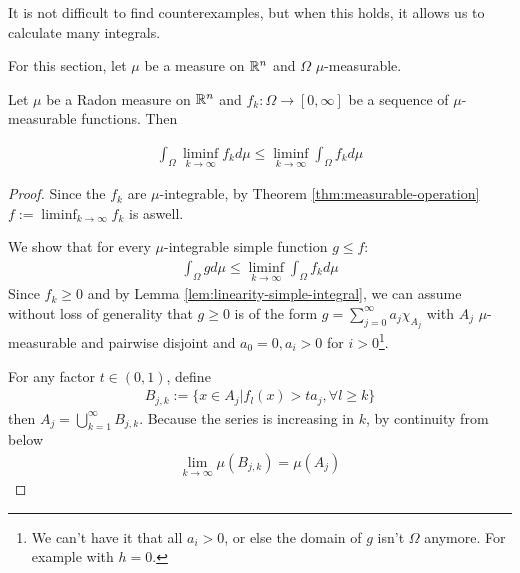 It is not difficult to find counterexamples, but when this holds, it allows us to calculate many integrals.

For this section, let $\mu$ be a measure on $\mathbb{R}^{n}$ and $\Omega$ $\mu$-measurable.


\begin{thm} \label{thm:fatou}
  Let $\mu$ be a Radon measure on $\mathbb{R}^{n}$ and $f_k: \Omega \to [0,\infty]$ be a sequence of $\mu$-measurable functions.
  Then

  \begin{align*}
    \int_{\Omega} \liminf_{k \to \infty} f_k d \mu \leq \liminf_{k \to \infty} \int_{\Omega} f_k d \mu
  \end{align*}
\end{thm}
\begin{proof}
  Since the $f_k$ are $\mu$-integrable, by Theorem \ref{thm:measurable-operation} $f := \liminf_{k \to \infty}f_k$ is aswell.

  We show that for every $\mu$-integrable simple function $g \leq f$:
  \begin{align*}
    \int_{\Omega} g d \mu \leq \liminf_{k \to \infty} \int_{\Omega} f_k d \mu
  \end{align*}
  Since $f_k \geq 0$ and by Lemma \ref{lem:linearity-simple-integral}, we can assume without loss of generality that $g \geq 0$ is of the form $g = \sum_{j=0}^{\infty} a_j \chi_{A_j}$ with $A_j$ $\mu$-measurable and pairwise disjoint and $a_0 = 0, a_i > 0$ for $i > 0$\footnote{We can't have it that all $a_i > 0$, or else the domain of $g$ isn't $\Omega$ anymore. For example with $h = 0$.}.
  
  For any factor $t \in (0,1)$, define
  \begin{align*}
    B_{j,k} := \{x \in A_j \big\vert f_l(x) > t a_j, \forall l \geq k\}
  \end{align*}
  then $A_j = \bigcup_{k=1}^{\infty}B_{j,k}$. 
  Because the series is increasing in $k$, by continuity from below
  \begin{align*}
    \lim_{k \to \infty} \mu(B_{j,k}) = \mu(A_j)
  \end{align*}


\end{proof}
